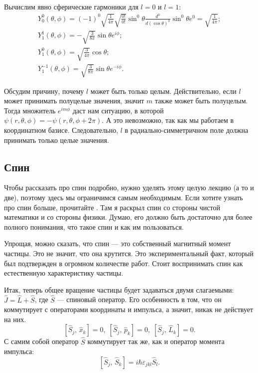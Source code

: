 Вычислим явно сферические гармоники для $l=0$ и $l=1$:
\begin{gather*}
  Y^0_0(\theta,\phi) = (-1)^0\sqrt{\frac{1}{4\pi}}\sqrt{\frac{0!}{0!}}\sin^0\theta \frac{d^0}{d(\cos\theta)^0} \sin^0 \theta e^{0} = \sqrt{\frac{1}{4\pi}};\\
  Y^1_1(\theta,\phi) = -\sqrt{\frac{3}{8\pi}}\sin\theta e^{i\phi};\\
  Y^0_1(\theta,\phi) = \sqrt{\frac{3}{4\pi}}\cos\theta;\\
  Y^{-1}_1(\theta,\phi) = \sqrt{\frac{3}{8\pi}}\sin\theta e^{-i\phi}.
\end{gather*}

Обсудим причину, почему $l$ может быть только целым. Действительно, если $l$
может принимать полуцелые значения, значит $m$ также может быть полуцелым.
Тогда множитель $e^{im\phi}$ даст нам ситуацию, в которой $\psi(r, \theta,
  \phi) = -\psi(r, \theta, \phi + 2\pi)$. А это невозможно, так как мы работаем в
координатном базисе. Следовательно, $l$ в радиально-симметричном поле должна
принимать только целые значения.

\subsection{Спин}
Чтобы рассказать про спин подробно, нужно уделять этому целую лекцию (а то и
две), поэтому здесь мы ограничимся самым необходимым. Если хотите узнать про
спин больше, прочитайте . Там я раскрыл спин со стороны
чистой математики и со стороны физики. Думаю, его должно быть достаточно для
более полного понимания, что такое спин и как им пользоваться.

Упрощая, можно сказать, что спин --- это собственный магнитный момент частицы.
Это не значит, что она крутится. Это экспериментальный факт, который был
подтвержден в огромном количестве работ. Стоит воспринимать спин как
естественную характеристику частицы.

Итак, теперь общее вращение частицы будет задаваться двумя слагаемыми: $\hat{J}
  = \hat{L} + \hat{S}$, где $\hat{S}$ --- спиновый оператор. Его особенность в
том, что он коммутирует с операторами координаты и импульса, а значит, никак не
действует на них.
\[
  \left[\hat{S}_j, \, \hat{x}_k\right] = 0,\; \left[\hat{S}_j, \, \hat{p}_k\right] = 0,\; \left[\hat{S}_j, \, \hat{L}_k\right] = 0.
\]
С самим собой оператор $\hat{S}$ коммутирует так же, как и оператор момента
импульса:
\[
  \left[\hat{S}_j, \, \hat{S}_k\right] = i\hbar\varepsilon_{jkl}\hat{S}_l.
\]

